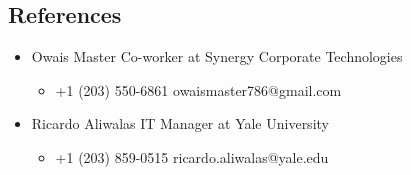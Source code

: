 \documentclass[letterpaper]{article}
\providecommand{\tightlist}{%
  \setlength{\itemsep}{0pt}\setlength{\parskip}{0pt}}
\begin{document}
\hypertarget{references}{%
\subsection{References}\label{references}}

\begin{itemize}
\item
  Owais Master \textbar{} Co-worker at Synergy Corporate Technologies

  \begin{itemize}
  \tightlist
  \item
    +1 (203) 550-6861 \textbar{} owaismaster786@gmail.com
  \end{itemize}
\item
  Ricardo Aliwalas \textbar{} IT Manager at Yale University

  \begin{itemize}
  \tightlist
  \item
    +1 (203) 859-0515 \textbar{} ricardo.aliwalas@yale.edu
  \end{itemize}
\end{itemize}
\end{document}
